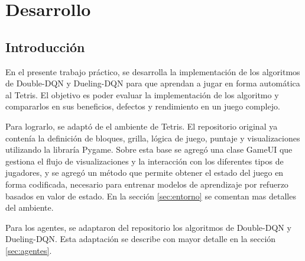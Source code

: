 
\chapter{Desarrollo} %

\label{Chapter1} %
\label{IntroGeneral}


\newcommand{\keyword}[1]{\textbf{#1}}
\newcommand{\tabhead}[1]{\textbf{#1}}
\newcommand{\code}[1]{\texttt{#1}}
\newcommand{\file}[1]{\texttt{\bfseries#1}}
\newcommand{\option}[1]{\texttt{\itshape#1}}
\newcommand{\grados}{$^{\circ}$}



\section{Introducción}

En el presente trabajo práctico, se desarrolla la implementación de los  algoritmos de Double-DQN y Dueling-DQN para que aprendan a jugar en forma automática al Tetris. El objetivo es poder evaluar la implementación de los algoritmo y compararlos en sus beneficios, defectos y rendimiento en un juego complejo.

Para lograrlo, se adaptó de \citep{WEBSITE:1} el ambiente de Tetris. El repositorio original ya contenía la definición de bloques, grilla, lógica de juego, puntaje y visualizaciones utilizando la libraría Pygame. Sobre esta base se agregó una clase GameUI que gestiona el flujo de visualizaciones y la interacción con los diferentes tipos de jugadores, y se agregó un método que permite obtener el estado del juego en forma codificada, necesario para entrenar modelos de aprendizaje por refuerzo basados en valor de estado. En la sección \ref{sec:entorno} se comentan mas detalles del ambiente.

Para los agentes, se adaptaron del repositorio \citep{WEBSITE:2} los algoritmos de Double-DQN y Dueling-DQN. Esta adaptación se describe con mayor detalle en la sección \ref{sec:agentes}.

